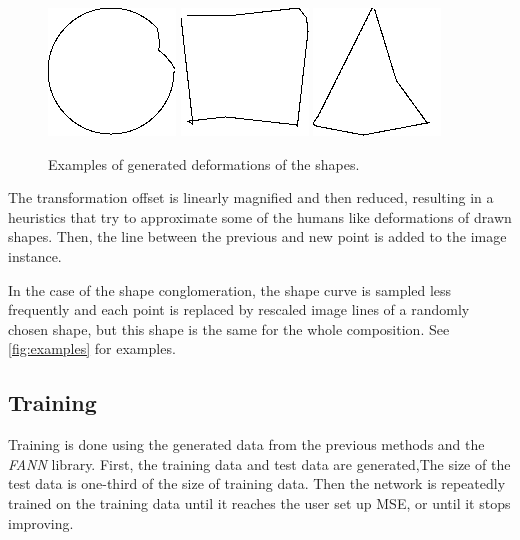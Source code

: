 \begin{figure}
\centering
\includegraphics[width=.3\linewidth]{ext/images/deformed0.png}
\quad
\includegraphics[width=.3\linewidth]{ext/images/deformed1.png}
\quad
\includegraphics[width=.3\linewidth]{ext/images/deformed2.png}

\caption{Examples of generated deformations of the shapes.}
\label{deformed}
\end{figure}

The transformation  offset is linearly magnified and then reduced, resulting in a heuristics that try to approximate some of the humans like deformations of drawn shapes. Then, the line between the previous and new point is added to the image instance. 

In the case of the shape conglomeration, the shape curve is sampled less frequently and each point is replaced by rescaled image lines of a randomly chosen shape, but this shape is the same for the whole composition. See \cref{fig:examples} for examples.

\subsection{Training}
Training is done using the generated data from the previous methods and the \emph{FANN} library. 
First, the training data and test data are generated,The size of the test data is one-third of the size of training data. Then the network is repeatedly trained on the training data until it reaches the user set up MSE, or until it stops improving.

